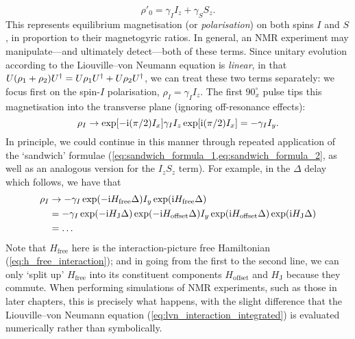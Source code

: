 \begin{equation}
    \label{eq:density_eqm_heteronuclear_simplified}
    \rho'_0 = \gamma_I I_z + \gamma_S S_z.
\end{equation}
This represents equilibrium magnetisation (or \textit{polarisation}) on both spins $I$ and $S$, in proportion to their magnetogyric ratios.
In general, an NMR experiment may manipulate---and ultimately detect---both of these terms.
Since unitary evolution according to the Liouville--von Neumann equation is \textit{linear}, in that $U(\rho_1 + \rho_2)U^\dagger = U\rho_1U^\dagger + U\rho_2U^\dagger$, we can treat these two terms separately: we focus first on the spin-$I$ polarisation, $\rho_I = \gamma_I I_z$.
The first $90^\circ_x$ \proton{} pulse tips this magnetisation into the transverse plane (ignoring off-resonance effects):
\begin{equation}
    \label{eq:rho_after_pulse_x}
    \rho_I \to \exp[-\mathrm{i}(\pi/2) I_x] \gamma_I I_z \exp[\mathrm{i}(\pi/2) I_x] = -\gamma_I I_y.
\end{equation}
In principle, we could continue in this manner through repeated application of the `sandwich' formulae (\cref{eq:sandwich_formula_1,eq:sandwich_formula_2}, as well as an analogous version for the $I_zS_z$ term). 
For example, in the $\Delta$ delay which follows, we have that
\begin{equation}
    \label{eq:rho_after_delay_x}
    \begin{aligned}
        \rho_I &\to -\gamma_I\exp(-\mathrm{i} H_\text{free} \Delta) I_y \exp(\mathrm{i} H_\text{free} \Delta) \\
               &= -\gamma_I\exp(-\mathrm{i} H_\text{J} \Delta)\exp(-\mathrm{i} H_\text{offset}\Delta) I_y \exp(\mathrm{i} H_\text{offset} \Delta)\exp(\mathrm{i} H_\text{J}\Delta) \\
               &= \ldots
    \end{aligned}
\end{equation}
Note that $H_\text{free}$ here is the interaction-picture free Hamiltonian (\cref{eq:h_free_interaction}); and in going from the first to the second line, we can only `split up' $H_\text{free}$ into its constituent components $H_\text{offset}$ and $H_\text{J}$ because they commute.
When performing simulations of NMR experiments, such as those in later chapters, this is precisely what happens, with the slight difference that the Liouville--von Neumann equation (\cref{eq:lvn_interaction_integrated}) is evaluated numerically rather than symbolically.

